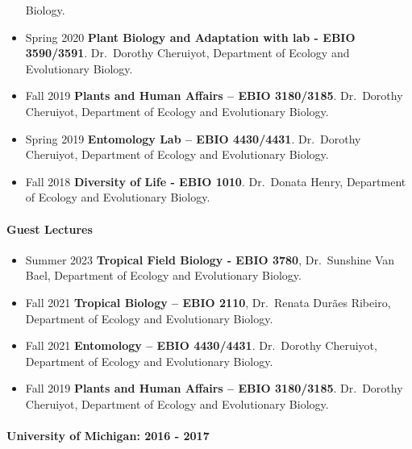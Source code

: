 \documentclass[11pt,a4paper,]{awesome-cv}
\begin{document}
\begin{itemize}
  Biology.\\
\item
  Spring 2020 \textbar{} \textbf{Plant Biology and Adaptation with lab -
  EBIO 3590/3591}. Dr.~Dorothy Cheruiyot, Department of Ecology and
  Evolutionary Biology.\\
\item
  Fall 2019 \textbar{} \textbf{Plants and Human Affairs -- EBIO
  3180/3185}. Dr.~Dorothy Cheruiyot, Department of Ecology and
  Evolutionary Biology.\\
\item
  Spring 2019 \textbar{} \textbf{Entomology Lab -- EBIO 4430/4431}.
  Dr.~Dorothy Cheruiyot, Department of Ecology and Evolutionary
  Biology.\\
\item
  Fall 2018 \textbar{} \textbf{Diversity of Life - EBIO 1010}.
  Dr.~Donata Henry, Department of Ecology and Evolutionary Biology.\\
\end{itemize}

\hypertarget{guest-lectures}{%
\paragraph{Guest Lectures}\label{guest-lectures}}

\begin{itemize}
\item
  Summer 2023 \textbar{} \textbf{Tropical Field Biology - EBIO 3780},
  Dr.~Sunshine Van Bael, Department of Ecology and Evolutionary Biology.
\item
  Fall 2021 \textbar{} \textbf{Tropical Biology -- EBIO 2110},
  Dr.~Renata Durães Ribeiro, Department of Ecology and Evolutionary
  Biology.\\
\item
  Fall 2021 \textbar{} \textbf{Entomology -- EBIO 4430/4431}.
  Dr.~Dorothy Cheruiyot, Department of Ecology and Evolutionary
  Biology.\\
\item
  Fall 2019 \textbar{} \textbf{Plants and Human Affairs -- EBIO
  3180/3185}. Dr.~Dorothy Cheruiyot, Department of Ecology and
  Evolutionary Biology.\\
\end{itemize}

\hypertarget{university-of-michigan-2016---2017}{%
\paragraph{University of Michigan: 2016 -
2017}\label{university-of-michigan-2016---2017}}
\end{document}
